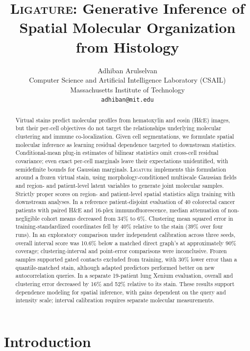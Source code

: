 \documentclass[10pt,letterpaper]{article}
\title{\textsc{Ligature}: Generative Inference of Spatial Molecular Organization from Histology}
\author{Adhiban Arulselvan\\[2pt]
{\normalsize Computer Science and Artificial Intelligence Laboratory (CSAIL)}\\
{\normalsize Massachusetts Institute of Technology}\\
{\normalsize\texttt{adhiban@mit.edu}}}
\date{}
\theoremstyle{definition}
\theoremstyle{remark}
\newcommand{\method}{\textnormal{\textsc{Ligature}}}
\begin{document}
\hypersetup{pageanchor=false}
\maketitle

\begin{abstract}\normalsize
Virtual stains predict molecular profiles from hematoxylin and eosin (H\&E) images, but their per-cell objectives do not target the relationships underlying molecular clustering and immune co-localization. Given cell segmentations, we formulate spatial molecular inference as learning residual dependence targeted to downstream statistics. Conditional-mean plug-in estimates of bilinear statistics omit cross-cell residual covariance; even exact per-cell marginals leave their expectations unidentified, with semidefinite bounds for Gaussian marginals. \method{} implements this formulation around a frozen virtual stain, using morphology-conditioned multiscale Gaussian fields and region- and patient-level latent variables to generate joint molecular samples. Strictly proper scores on region- and patient-level spatial statistics align training with downstream analyses. In a reference patient-disjoint evaluation of 40 colorectal cancer patients with paired H\&E and 16-plex immunofluorescence, median attenuation of non-negligible cohort means decreased from 34\% to 6\%. Clustering mean squared error in training-standardized coordinates fell by 40\% relative to the stain (39\% over four runs). In an exploratory comparison under independent calibration across three seeds, overall interval score was 10.6\% below a matched direct graph's at approximately 90\% coverage; clustering-interval and point-error comparisons were inconclusive. Frozen samples supported gated contacts excluded from training, with 30\% lower error than a quantile-matched stain, although adapted predictors performed better on new autocorrelation queries. In a separate 19-patient lung Xenium evaluation, overall and clustering error decreased by 16\% and 52\% relative to its stain. These results support dependence modeling for spatial inference, with gains dependent on the query and intensity scale; interval calibration requires separate molecular measurements.
\end{abstract}
\thispagestyle{empty}
\newpage
\setcounter{page}{1}
\hypersetup{pageanchor=true}

\section{Introduction}
\end{document}
